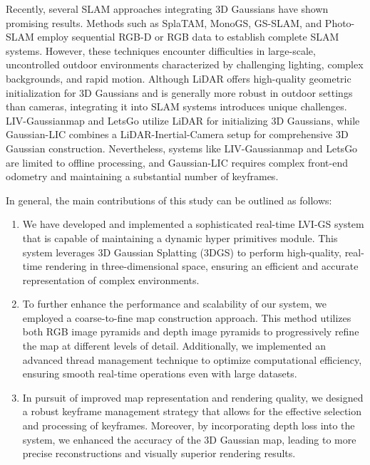 \documentclass[lettersize,journal]{IEEEtran}
\begin{document}
Recently, several SLAM approaches integrating 3D Gaussians have shown promising results. Methods such as SplaTAM\cite{splatam}, MonoGS\cite{monogs}, GS-SLAM\cite{gsslam}, and Photo-SLAM\cite{photoslam} employ sequential RGB-D or RGB data to establish complete SLAM systems. However, these techniques encounter difficulties in large-scale, uncontrolled outdoor environments characterized by challenging lighting, complex backgrounds, and rapid motion. Although LiDAR offers high-quality geometric initialization for 3D Gaussians and is generally more robust in outdoor settings than cameras, integrating it into SLAM systems introduces unique challenges. LIV-Gaussianmap\cite{livgaussmap} and LetsGo\cite{letsgo} utilize LiDAR for initializing 3D Gaussians, while Gaussian-LIC\cite{gaussianlic} combines a LiDAR-Inertial-Camera setup for comprehensive 3D Gaussian construction. Nevertheless, systems like LIV-Gaussianmap\cite{livgaussmap} and LetsGo\cite{letsgo} are limited to offline processing, and Gaussian-LIC\cite{gaussianlic} requires complex front-end odometry and maintaining a substantial number of keyframes.

In general, the main contributions of this study can be outlined as follows:
\begin{enumerate}
\item 
We have developed and implemented a sophisticated real-time LVI-GS system that is capable of maintaining a dynamic hyper primitives module. This system leverages 3D Gaussian Splatting (3DGS) to perform high-quality, real-time rendering in three-dimensional space, ensuring an efficient and accurate representation of complex environments.
\item 
To further enhance the performance and scalability of our system, we employed a coarse-to-fine map construction approach. This method utilizes both RGB image pyramids and depth image pyramids to progressively refine the map at different levels of detail. Additionally, we implemented an advanced thread management technique to optimize computational efficiency, ensuring smooth real-time operations even with large datasets.
\item 
In pursuit of improved map representation and rendering quality, we designed a robust keyframe management strategy that allows for the effective selection and processing of keyframes. Moreover, by incorporating depth loss into the system, we enhanced the accuracy of the 3D Gaussian map, leading to more precise reconstructions and visually superior rendering results.
\end{enumerate}
\end{document}
